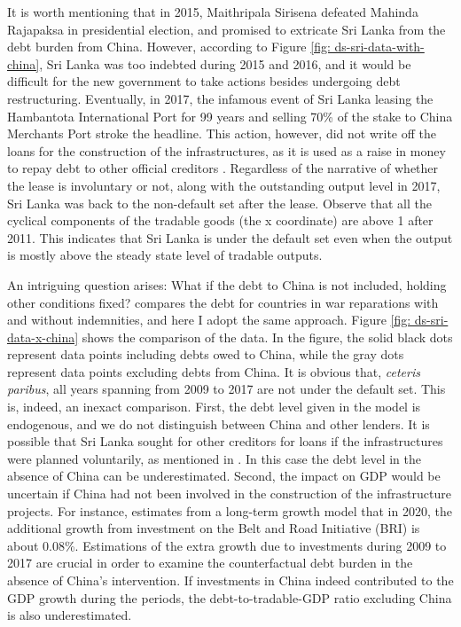 It is worth mentioning that in 2015, Maithripala Sirisena defeated Mahinda Rajapaksa in presidential election, and promised to extricate Sri Lanka from the debt burden from China. However, according to Figure \ref{fig: ds-sri-data-with-china}, Sri Lanka was too indebted during 2015 and 2016, and it would be difficult for the new government to take actions besides undergoing debt restructuring. Eventually, in 2017, the infamous event of Sri Lanka leasing the Hambantota International Port for 99 years and selling 70\% of the stake to China Merchants Port stroke the headline. This action, however, did not write off the loans for the construction of the infrastructures, as it is used as a raise in money to repay debt to other official creditors \citep{Brautigam-meme-2020, Moramudali_2019}. Regardless of the narrative of whether the lease is involuntary or not, along with the outstanding output level in 2017, Sri Lanka was back to the non-default set after the lease.
Observe that all the cyclical components of the tradable goods (the x coordinate) are above 1 after 2011. This indicates that Sri Lanka is under the default set even when the output is mostly above the steady state level of tradable outputs.

An intriguing question arises: What if the debt to China is not included, holding other conditions fixed? \citet{Hinrichsen_2020-chapter4} compares the debt for countries in war reparations with and without indemnities, and here I adopt the same approach. Figure \ref{fig: ds-sri-data-x-china} shows the comparison of the data. In the figure, the solid black dots represent data points including debts owed to China, while the gray dots represent data points excluding debts from China.
It is obvious that, \emph{ceteris paribus}, all years spanning from 2009 to 2017 are not under the default set. This is, indeed, an inexact comparison.
First, the debt level given in the model is endogenous, and we do not distinguish between China and other lenders. It is possible that Sri Lanka sought for other creditors for loans if the infrastructures were planned voluntarily, as mentioned in \citet{Brautigam-meme-2020}. In this case the debt level in the absence of China can be underestimated.
Second, the impact on GDP would be uncertain if China had not been involved in the construction of the infrastructure projects. For instance, \citet{Bandiera-Vasileios-BRI-debt} estimates from a long-term growth model that in 2020, the additional growth from investment on the Belt and Road Initiative (BRI) is about 0.08\%.
Estimations of the extra growth due to investments during 2009 to 2017 are crucial in order to examine the counterfactual debt burden in the absence of China's intervention. If investments in China indeed contributed to the GDP growth during the periods, the debt-to-tradable-GDP ratio excluding China is also underestimated.

